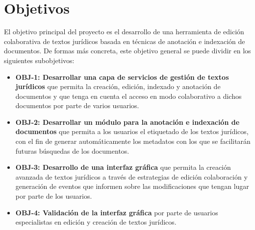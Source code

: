 \section{Objetivos}
El objetivo principal del proyecto es el desarrollo de una herramienta de edición colaborativa de textos jurídicos basada en técnicas de anotación e indexación de documentos. De formas más concreta, este objetivo general se puede dividir en los siguientes subobjetivos:
\begin{itemize}
\item {\bf OBJ-1: Desarrollar una capa de servicios de gestión de textos jurídicos} que permita la creación, edición, indexado y anotación de documentos y que tenga en cuenta el acceso en modo colaborativo a dichos documentos por parte de varios usuarios.
\item {\bf OBJ-2: Desarrollar un módulo para la anotación e indexación de documentos} que permita a los usuarios el etiquetado de los textos jurídicos, con el fin de generar automáticamente los metadatos con los que se facilitarán futuras búsquedas de los documentos.
\item {\bf OBJ-3: Desarrollo de una interfaz gráfica} que permita la creación avanzada de textos jurídicos a través de estrategias de edición colaboración y generación de eventos que informen sobre las modificaciones que tengan lugar por parte de los usuarios.
\item {\bf OBJ-4: Validación de la interfaz gráfica} por parte de usuarios especialistas en edición y creación de textos jurídicos.
\end{itemize}